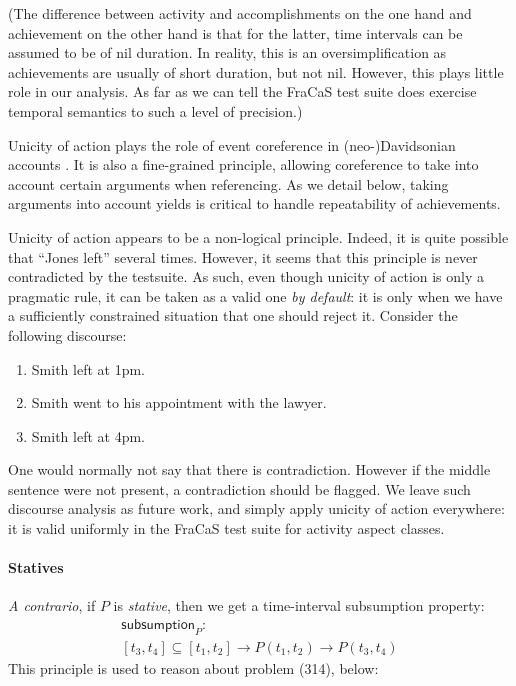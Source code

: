 \documentclass[11pt,a4paper]{article}
\newcommand\constant[1]{\mathsf{#1}}
\begin{document}
(The difference between activity and accomplishments on the one hand and
achievement on the other hand is that for the latter, time intervals
can be assumed to be of nil duration. In reality, this is an
oversimplification as achievements are usually of short duration, but
not nil. However, this plays little role in our
analysis. As far as we can tell the FraCaS test suite does exercise temporal semantics to
such a level of precision.)

Unicity of action plays the role of event coreference in
(neo-)Davidsonian accounts \citep{parsons1990events}. It is also a fine-grained
principle, allowing coreference to take into account certain arguments
when referencing. As we detail below, taking arguments into account
yields is critical to handle repeatability of achievements.

Unicity of action appears to be a non-logical principle. Indeed, it is
quite possible that ``Jones left'' several times. However, it seems
that this principle is never contradicted by the testsuite. As such,
even though unicity of action is only a pragmatic rule, it can be
taken as a valid one \emph{by default}: it is only when we have a
sufficiently constrained situation that one should reject it. Consider
the following discourse:
\begin{enumerate}[parsep=0pt,itemsep=1pt,label=(\arabic*)]
\item Smith left at 1pm.
\item Smith went to his appointment with the lawyer.
\item Smith left at 4pm.
\end{enumerate}
One would normally not say that there is contradiction. However if the
middle sentence were not present, a contradiction should be
flagged. We leave such discourse analysis as future work, and simply
apply unicity of action everywhere: it is valid uniformly in the
FraCaS test suite for activity aspect classes.


\paragraph{Statives}
\textit{A contrario}, if \(P\) is \emph{stative}, then we get a time-interval subsumption property:
\vspace{-1.5ex}
\begin{multline*}
\constant {subsumption}_P :\\ [t_3,t_4] ⊆ [t_1,t_2] → P (t_1,t_2) → P (t_3,t_4)
\end{multline*}
This principle is used to reason about problem (314), below:
\end{document}
